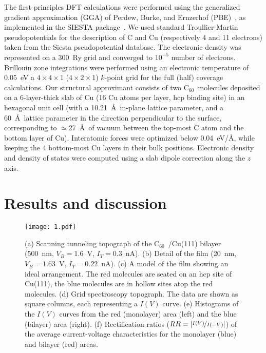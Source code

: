 \documentclass[11pt,showpacs,amsmath,amssymbl]{revtex4}
\newcommand{\buck}{C$_{60}$~}
\begin{document}
The first-principles DFT calculations were performed using the generalized gradient approximation (GGA) of Perdew, Burke, and Ernzerhof (PBE)~\cite{PBEGGA}, as implemented in the SIESTA package~\cite{siesta}. We used standard Troullier-Martin pseudopotentials for the description of C and Cu (respectively 4 and 11 electrons) taken from the Siesta pseudopotential database. The electronic density was represented on a $300$~Ry grid and converged  to $10^{-5}$ number of electrons. Brillouin zone integrations were performed using an electronic temperature of $0.05$~eV a $4\times4\times1$ ($4\times2\times1$) $k$-point grid for the full (half) coverage calculations. Our structural approximant consists of two \buck molecules deposited on a 6-layer-thick slab of Cu (16 Cu atoms per layer, hcp binding site) in an hexagonal unit cell (with a 10.21~\AA~in-plane lattice parameter, and a 60~\AA~lattice parameter in the direction perpendicular to the surface, corresponding to $\simeq$27~\AA~of vacuum between the top-most C atom and the bottom layer of Cu). Interatomic forces were optimized below 0.04~eV/\AA, while keeping the 4 bottom-most Cu layers in their bulk positions. Electronic density and density of states were computed using a slab dipole correction along the $z$ axis. 



\section{Results and discussion}

\begin{figure}
\texttt{[image: 1.pdf]}
\caption{(a) Scanning tunneling topograph of the \buck/Cu(111) bilayer (\SI{500}{\nano\meter}, $V_B=1.6$~V, $I_T=0.3$~nA). (b) Detail of the film (\SI{20}{\nano\meter}, $V_B=1.63$~V, $I_T=0.22$~nA). (c) A model of the film showing an ideal arrangement.  The red molecules are seated on an hcp site of Cu(111), the blue molecules are in hollow sites atop the red molecules. (d) Grid spectroscopy topograph.  The data are shown as square columns, each representing a $I(V)$ curve. (e) Histograms of the $I(V)$ curves from the red (monolayer) area (left) and the blue (bilayer) area (right). (f) Rectification ratios ($RR = \left| \nicefrac{I(V)}{I(-V)} \right| $) of the average current-voltage characteristics for the monolayer (blue) and bilayer (red) areas.}
\label{1}
\end{figure}
\end{document}
